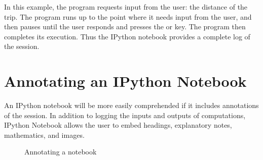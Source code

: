 \documentclass[letterpaper,10pt,english]{sphinxmanual}
\begin{document}
\sphinxAtStartPar
In this example, the program requests input from the user: the distance of the trip.  The program runs up to the point where it needs input from the user, and then pauses until the user responds and presses the  or  key.  The program then completes its execution.  Thus the IPython notebook provides a complete log of the session.


\section{Annotating an IPython Notebook}
\label{\detokenize{apdx2/apdx2_ipynb:annotating-an-ipython-notebook}}
\sphinxAtStartPar
An IPython notebook will be more easily comprehended if it includes annotations of the session.  In addition to logging the inputs and outputs of computations, IPython Notebook allows the user to embed headings, explanatory notes, mathematics, and images.

\begin{figure}[htbp]
\centering
\capstart

\noindent{}
\caption{Annotating a notebook}\label{\detokenize{apdx2/apdx2_ipynb:id5}}\label{\detokenize{apdx2/apdx2_ipynb:fig-ipynotefinaltop}}\end{figure}
\end{document}
